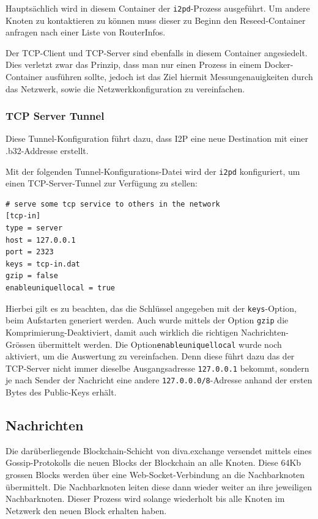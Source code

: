Hauptsächlich wird in diesem Container der \lstinline|i2pd|-Prozess ausgeführt.
Um andere Knoten zu kontaktieren zu können muss dieser zu Beginn den Reseed-Container anfragen nach einer Liste von RouterInfos.

Der TCP-Client und TCP-Server sind ebenfalls in diesem Container angesiedelt.
Dies verletzt zwar das Prinzip, dass man nur einen Prozess in einem Docker-Container ausführen sollte,
jedoch ist das Ziel hiermit Messungenauigkeiten durch das Netzwerk, sowie die Netzwerkkonfiguration zu vereinfachen.


\subsubsection{TCP Server Tunnel}

Diese Tunnel-Konfiguration führt dazu, dass I2P eine neue Destination mit einer .b32-Addresse erstellt.

Mit der folgenden Tunnel-Konfigurations-Datei wird der \lstinline|i2pd| konfiguriert, um einen TCP-Server-Tunnel zur Verfügung zu stellen:
\begin{lstlisting}
# serve some tcp service to others in the network
[tcp-in]
type = server
host = 127.0.0.1
port = 2323
keys = tcp-in.dat
gzip = false
enableuniquellocal = true
\end{lstlisting}

Hierbei gilt es zu beachten, das die Schlüssel angegeben mit der \lstinline|keys|-Option, beim Aufstarten generiert werden.
Auch wurde mittels der Option \lstinline|gzip| die Komprimierung-Deaktiviert, damit auch wirklich die richtigen Nachrichten-Grössen übermittelt werden.
Die Option\lstinline|enableuniquellocal| wurde noch aktiviert, um die Auswertung zu vereinfachen. Denn diese führt dazu das der TCP-Server nicht immer dieselbe Ausgangsadresse \lstinline|127.0.0.1| bekommt, sondern je nach Sender der Nachricht eine andere \lstinline|127.0.0.0/8|-Adresse anhand der ersten Bytes des Public-Keys erhält.


\subsection{Nachrichten}

Die darüberliegende Blockchain-Schicht von diva.exchange versendet mittels eines Gossip-Protokolls die neuen Blocks der Blockchain an alle Knoten.
Diese 64Kb grossen Blocks werden über eine Web-Socket-Verbindung an die Nachbarknoten übermittelt.
Die Nachbarknoten leiten diese dann wieder weiter an ihre jeweiligen Nachbarknoten.
Dieser Prozess wird solange wiederholt bis alle Knoten im Netzwerk den neuen Block erhalten haben.

